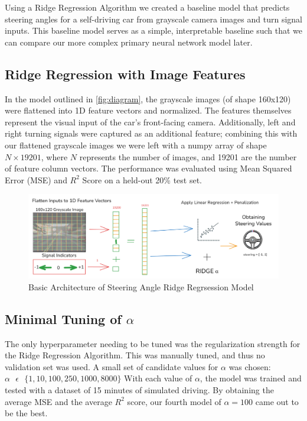 \documentclass{article} %
\begin{document}
Using a Ridge Regression Algorithm we created a baseline model that predicts steering angles for a self-driving car
from grayscale camera images and turn signal inputs. This baseline model serves as a simple, interpretable baseline
such that we can compare our more complex primary neural network model later. 


\subsection{Ridge Regression with Image Features}

In the model outlined in \autoref{fig:diagram}, the grayscale images (of shape 160x120) were flattened into 1D feature vectors and normalized. The features themselves
represent the visual input of the car's front-facing camera. Additionally, left and right turning signals were captured as an
additional feature; combining this with our flattened grayscale images we were left with a numpy array of shape $N \times 19201$,
where $N$ represents the number of images, and 19201 are the number of feature column vectors.  The performance was evaluated using Mean Squared 
Error (MSE) and $R^2$ Score on a held-out 20\% test set.

\begin{figure}[H] %
    \centering
    \includegraphics[width=1.0\textwidth]{diagram.png} %
    \caption{Basic Architecture of Steering Angle  Ridge Regrsession Model}
    \label{fig:diagram}
\end{figure}


\subsection{Minimal Tuning of $\alpha$}
The only hyperparameter needing to be tuned was the regularization strength for the Ridge Regression Algorithm. This was manually tuned,
and thus no validation set was used. A small set of candidate values for $\alpha$ was chosen: $\alpha \text{ } \epsilon \text{ }
    \{ 1, 10, 100, 250, 1000, 8000\}$ With each value of $\alpha$, the model was trained and tested with a dataset of 15 minutes of simulated
driving. By obtaining the average MSE and the average $R^2$ score, our fourth model of $\alpha = 100$ came out to be the best.
\end{document}
